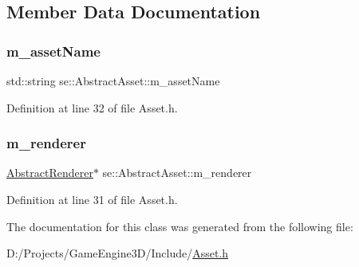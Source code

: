 \subsection{Member Data Documentation}
\mbox{\label{classse_1_1_abstract_asset_af2a5f8455bda2db6577864b79d4246d1}} 
\subsubsection{\texorpdfstring{m\+\_\+asset\+Name}{m\_assetName}}
{\footnotesize\ttfamily std\+::string se\+::\+Abstract\+Asset\+::m\+\_\+asset\+Name\hspace{0.3cm}{\ttfamily [protected]}}



Definition at line 32 of file Asset.\+h.

\mbox{\label{classse_1_1_abstract_asset_a9f151d3b1c32c1f244f1b4569e67956c}} 
\subsubsection{\texorpdfstring{m\+\_\+renderer}{m\_renderer}}
{\footnotesize\ttfamily \mbox{\hyperlink{classse_1_1_abstract_renderer}{Abstract\+Renderer}}$\ast$ se\+::\+Abstract\+Asset\+::m\+\_\+renderer\hspace{0.3cm}{\ttfamily [protected]}}



Definition at line 31 of file Asset.\+h.



The documentation for this class was generated from the following file\+:\begin{DoxyCompactItemize}
\item 
D\+:/\+Projects/\+Game\+Engine3\+D/\+Include/\mbox{\hyperlink{_asset_8h}{Asset.\+h}}\end{DoxyCompactItemize}
